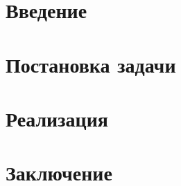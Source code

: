 \section{Введение}

\newpage
\section{Постановка задачи}

\newpage
\section{Реализация}

\newpage
\section{Заключение}

